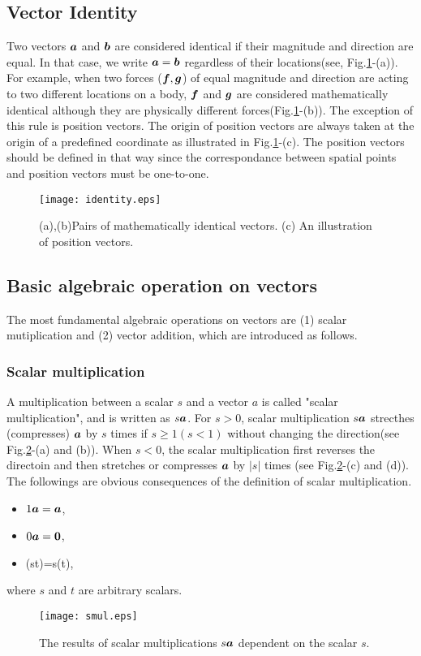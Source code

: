 \documentclass[10pt,a4j]{article}
\begin{document}
\subsection{Vector Identity}
Two vectors $\mbox{\boldmath $a$}$ and $\mbox{\boldmath $b$}$ are considered identical 
if their magnitude and direction are equal.
In that case, we write $\mbox{\boldmath $a$}=\mbox{\boldmath $b$}$ regardless of their locations(see, Fig.\ref{fig:fig1_2}-(a)). 
For example, when two forces ($\mbox{\boldmath $f$}, \mbox{\boldmath $g$}$) of equal magnitude and direction 
are acting to two different locations on a body, 
$\mbox{\boldmath $f$}$ and $\mbox{\boldmath $g$}$ are considered mathematically identical although they 
are physically different forces(Fig.\ref{fig:fig1_2}-(b)).
The exception of this rule is position vectors. 
The origin of position vectors are always taken at 
the origin of a predefined coordinate as illustrated in Fig.\ref{fig:fig1_2}-(c).
The position vectors should be defined in that way since the correspondance between 
spatial points and position vectors must be one-to-one. 
\begin{figure}[h]
	\begin{center}
	\texttt{[image: identity.eps]} 
	\end{center}
	\caption{(a),(b)Pairs of mathematically identical vectors. 
	(c) An illustration of position vectors.} 
	\label{fig:fig1_2}
\end{figure}
\subsection{Basic algebraic operation on vectors}
The most fundamental algebraic operations on vectors are (1) scalar mutiplication and (2) vector addition, which are introduced as follows.
\subsubsection{Scalar multiplication}
A multiplication between a scalar $s$ and a vector $a$ is called "scalar multiplication", and is written as $s\mbox{\boldmath $a$}$. For $s>0$, scalar multiplication $s\mbox{\boldmath $a$}$ strecthes (compresses) $\mbox{\boldmath $a$}$ 
by $s$ times if $s \geq 1 (s<1)$ without changing the direction(see Fig.\ref{fig:fig1_3}-(a) and (b)).
When $s<0$, the scalar multiplication first reverses the directoin and then stretches or compresses 
$\mbox{\boldmath $a$}$ by $|s|$ times (see Fig.\ref{fig:fig1_3}-(c) and (d)).
The followings are obvious consequences of the definition of scalar multiplication. 
\begin{itemize}
\item 
    $1\mbox{\boldmath $a$}=\mbox{\boldmath $a$}$,
\item 
    $0\mbox{\boldmath $a$}=\mbox{\boldmath $0$}$,
\item
    (st)=s(t),
\end{itemize}
where $s$ and $t$ are arbitrary scalars. 
\begin{figure}[h]
    \begin{center}
    \texttt{[image: smul.eps]} 
    \end{center}
    \caption{The results of scalar multiplications $s\mbox{\boldmath $a$}$ dependent on the scalar $s$.} 
    \label{fig:fig1_3}
\end{figure}
\end{document}
